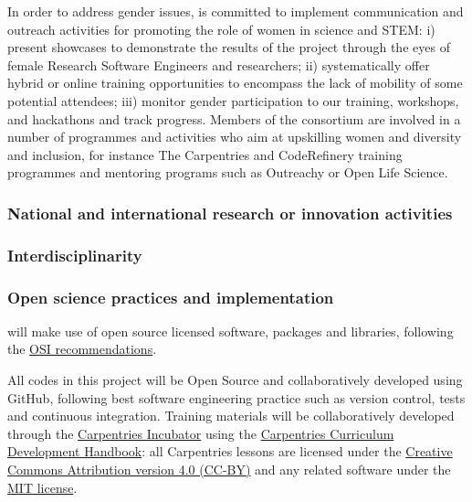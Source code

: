 In order to address gender issues, \TheProject is committed to implement
communication and outreach activities for promoting the role of women in science
and STEM: i) present showcases to demonstrate the results of the project through
the eyes of female Research Software Engineers and researchers; ii)
systematically offer hybrid or online training opportunities to encompass the
lack of mobility of some potential attendees; iii) monitor gender participation
to our training, workshops, and hackathons and track progress. Members of the
consortium are involved in a number of programmes and activities who aim at
upskilling women and diversity and inclusion, for instance The Carpentries and
CodeRefinery training programmes and mentoring programs such as Outreachy or
Open Life Science.

\subsubsection{National and international research or innovation activities}

\TOWRITE{}{}

\subsubsection{Interdisciplinarity}

\TOWRITE{}{}

\subsubsection{Open science practices and implementation}

\TheProject will make use of open source licensed software, packages and libraries, following the \href{https://opensource.org/licenses}{OSI recommendations}. 

All codes in this project will be Open Source and collaboratively developed using GitHub, following best software engineering practice 
such as version control, tests and continuous integration.
Training materials will be collaboratively developed through the \href{https://carpentries-incubator.org/}{Carpentries Incubator} 
using the \href{https://cdh.carpentries.org/}{Carpentries Curriculum Development Handbook}: all Carpentries lessons are licensed under  
the \href{https://creativecommons.org/licenses/by/4.0/legalcode}{Creative Commons Attribution version 4.0 (CC-BY)} and any related software under
the \href{https://opensource.org/licenses/MIT}{MIT license}. 


